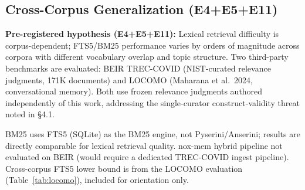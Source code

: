 \subsection{Cross-Corpus Generalization (E4+E5+E11)}
\label{sec:cross-corpus}

\textbf{Pre-registered hypothesis (E4+E5+E11):} Lexical retrieval difficulty is corpus-dependent;
FTS5/BM25 performance varies by orders of magnitude across corpora with different vocabulary
overlap and topic structure. Two third-party benchmarks are evaluated: BEIR TREC-COVID
(NIST-curated relevance judgments, 171K documents) and LOCOMO (Maharana et al.\ 2024,
conversational memory). Both use frozen relevance judgments authored independently of
this work, addressing the single-curator construct-validity threat noted in \S4.1.

\begin{table}[!ht]
  \caption{Cross-corpus nDCG@10 --- BEIR TREC-COVID (171K docs, 50 queries, NIST Round 5 qrels \cite{thakur2021beir}). Cross-corpus FTS5 row is a lower bound: nox-mem hybrid was not evaluated on BEIR (requires separate ingest pipeline).}
  \label{tab:beir}
  \centering
  \small
  \begin{minipage}{\linewidth}
    \vspace{4pt}\footnotesize
    BM25 uses FTS5 (SQLite) as the BM25 engine, not Pyserini/Anserini; results are directly comparable for lexical retrieval quality. nox-mem hybrid pipeline not evaluated on BEIR (would require a dedicated TREC-COVID ingest pipeline). Cross-corpus FTS5 lower bound is from the LOCOMO evaluation (Table~\ref{tab:locomo}), included for orientation only.
  \end{minipage}
\end{table}

